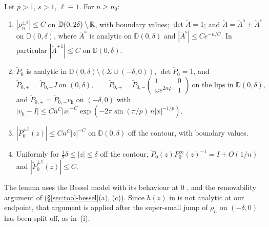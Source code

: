 \begin{lemma}\label{lem:classical-param}
Let $p>1$, $s>1$, $\ell\equiv1$. For $n\ge n_0$:
\begin{enumerate}
\item[(i)] $|\rho_n^{\pm1}|\le C$ on $\mathbb D(0,2\delta)\setminus\mathbb{R}$, with boundary values; $\det\check A=1$; and
  $\check A=\check A^{\mathrm a}+\check A^{\mathrm s}$ on $\mathbb D(0,\delta)$, where $\check A^{\mathrm a}$ is analytic on
  $\mathbb D(0,\delta)$ and $|\check A^{\mathrm s}|\le Ce^{-n/C}$. In particular $|\check A^{\pm1}|\le C$ on $\mathbb D(0,\delta)$.
\item[(ii)] $\check P_0$ is analytic in $\mathbb D(0,\delta)\setminus(\Sigma\cup(-\delta,0))$, $\det\check P_0=1$, and
  \[
    \check P_{0,+}=\check P_{0,-}J\ \text{on }(0,\delta),\qquad
    \check P_{0,+}=\check P_{0,-}\begin{pmatrix}1&0\\\omega e^{2n\varphi}&1\end{pmatrix}\ \text{on the lips in }\mathbb D(0,\delta),
  \]
  and $\check P_{0,+}=\check P_{0,-}v_{\mathrm h}$ on $(-\delta,0)$ with
  $|v_{\mathrm h}-I|\le Cn^C|x|^{-C}\exp(-2\pi\sin(\pi/p)\,n|x|^{-1/p})$.
\item[(iii)] $|\check P_0^{\pm1}(z)|\le Cn^C|z|^{-C}$ on $\mathbb D(0,\delta)$ off the contour, with boundary values.
\item[(iv)] Uniformly for $\frac12\delta\le|z|\le\delta$ off the contour, $\check P_0(z)P^\infty_0(z)^{-1}=I+O(1/n)$ and
  $|\check P_0^{\pm1}(z)|\le C$.
\end{enumerate}
\end{lemma}

The lemma uses the Bessel model \cite[(6.16)--(6.18), (6.23)--(6.28), Theorem~6.3]{KMVV} with its behaviour at $0$
\cite[(6.19)--(6.21)]{KMVV}, and the removability argument of \cite[proof of Proposition~6.5]{KMVV}
(\S\ref{sec:tool-bessel}(a), (c)). Since $h(z)$ in \cite[(1.1)]{KMVV} is not analytic at our endpoint, that argument is
applied after the super-small jump of $\rho_n$ on $(-\delta,0)$ has been split off, as in~(i).

